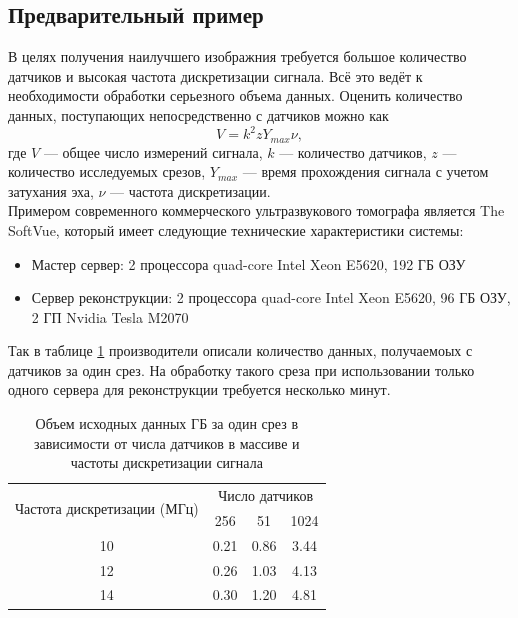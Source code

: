 \documentclass[14pt]{matmex-diploma}
\begin{document}
\subsection{Предварительный пример}
В целях получения наилучшего изображния требуется большое количество датчиков и высокая частота дискретизации сигнала. Всё это ведёт к необходимости обработки серьезного объема данных. Оценить количество данных, поступающих непосредственно с датчиков можно как
\[ V = k^2  z  Y_{max} \nu,   \]
где $V$ --- общее число измерений сигнала, $k$ --- количество датчиков, $z$ --- количество исследуемых срезов, $Y_{max}$ --- время прохождения сигнала с учетом затухания эха, $\nu$ --- частота дискретизации. \\

Примером современного коммерческого ультразвукового томографа является The SoftVue\cite{roy2013breast}, который имеет следующие технические характеристики системы:
\begin{itemize}
\item Мастер сервер: 2 процессора quad-core Intel Xeon E5620, 192 ГБ ОЗУ
\item Сервер реконструкции: 2 процессора quad-core Intel Xeon E5620, 96 ГБ ОЗУ, 2 ГП Nvidia Tesla M2070
\end{itemize}
Так в таблице \ref{table:datasize_ex} производители описали количество данных, получаемоых с датчиков за один срез. На обработку такого среза при использовании только одного сервера для реконструкции требуется несколько минут\cite{roy2013breast}.


\begin{table}
\centering
\caption{Объем исходных данных ГБ за один срез в зависимости от числа датчиков в массиве и частоты дискретизации сигнала \cite{roy2013breast}}
\begin{tabular}{ c | c | c | c }
    \hline
    \multirow{2}{*}{Частота дискретизации (МГц)} & \multicolumn{3}{c}{Число датчиков}  \\ \cline{2-4}
    & 256 & 51 & 1024 \\
    
    \hline
    10 & 0.21 & 0.86 & 3.44 \\
    12 & 0.26 & 1.03 & 4.13 \\
    14 & 0.30 & 1.20 & 4.81 \\
    \hline
\end{tabular}

\label{table:datasize_ex}
\end{table}
\end{document}

